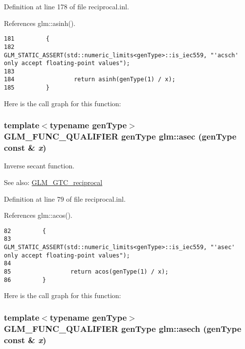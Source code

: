 Definition at line 178 of file reciprocal.inl.

References glm::asinh().

\begin{Code}\begin{verbatim}181         {
182                 GLM_STATIC_ASSERT(std::numeric_limits<genType>::is_iec559, "'acsch' only accept floating-point values");
183 
184                 return asinh(genType(1) / x);
185         }
\end{verbatim}
\end{Code}




Here is the call graph for this function:\hypertarget{group__gtc__reciprocal_g79e2b1e9949a6c514eef05d462ab01a0}{
\subsubsection[asec]{\setlength{\rightskip}{0pt plus 5cm}template$<$typename genType$>$ GLM\_\-FUNC\_\-QUALIFIER genType glm::asec (genType const \& {\em x})}}
\label{group__gtc__reciprocal_g79e2b1e9949a6c514eef05d462ab01a0}


Inverse secant function.

\begin{Desc}
\item[See also:]\hyperlink{group__gtc__reciprocal}{GLM\_\-GTC\_\-reciprocal} \end{Desc}


Definition at line 79 of file reciprocal.inl.

References glm::acos().

\begin{Code}\begin{verbatim}82         {
83                 GLM_STATIC_ASSERT(std::numeric_limits<genType>::is_iec559, "'asec' only accept floating-point values");
84         
85                 return acos(genType(1) / x);
86         }
\end{verbatim}
\end{Code}




Here is the call graph for this function:\hypertarget{group__gtc__reciprocal_g05d1bc30693d02a9a08c9044d75c5333}{
\subsubsection[asech]{\setlength{\rightskip}{0pt plus 5cm}template$<$typename genType$>$ GLM\_\-FUNC\_\-QUALIFIER genType glm::asech (genType const \& {\em x})}}
\label{group__gtc__reciprocal_g05d1bc30693d02a9a08c9044d75c5333}


